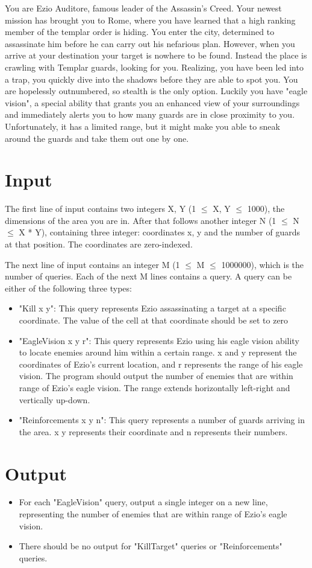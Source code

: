 

You are Ezio Auditore, famous leader of the Assassin's Creed. Your newest mission has brought you to Rome, where you have learned that a high ranking member of the templar order is hiding. You enter the city, determined to assassinate him before he can carry out his nefarious plan.
However, when you arrive at your destination your target is nowhere to be found. Instead the place is crawling with Templar guards, looking for you. Realizing, you have been led into a trap, you quickly dive into the shadows before they are able to spot you.
You are hopelessly outnumbered, so stealth is the only option. Luckily you have "eagle vision", a special ability that grants you an enhanced view of your surroundings and immediately alerts you to how many guards are in close proximity to you. Unfortunately, it has a limited range, but it might make you able to sneak around the guards and take them out one by one.

\section*{Input}

The first line of input contains two integers X, Y (1 $\le$ X, Y $\le$ 1000), the dimensions of the area you are in. After that follows another integer N (1 $\le$ N $\le$ X * Y), containing three integer: coordinates x, y and the number of guards at that position. The coordinates are zero-indexed.

The next line of input contains an integer M (1 $\le$ M $\le$ 1000000), which is the number of queries. Each of the next M lines contains a query. A query can be either of the following three types:

\begin{itemize}
    \item "Kill x y": This query represents Ezio assassinating a target at a specific coordinate. The value of the cell at that coordinate should be set to zero
    \item "EagleVision x y r": This query represents Ezio using his eagle vision ability to locate enemies around him within a certain range. x and y represent the coordinates of Ezio's current location, and r represents the range of his eagle vision. The program should output the number of enemies that are within range of Ezio's eagle vision. The range extends horizontally left-right and vertically up-down.
    \item "Reinforcements x y n": This query represents a number of guards arriving in the area. x y represents their coordinate and n represents their numbers.
\end{itemize}

\section*{Output}

\begin{itemize}
    \item For each "EagleVision" query, output a single integer on a new line, representing the number of enemies that are within range of Ezio's eagle vision.
    \item There should be no output for "KillTarget" queries or "Reinforcements" queries. 
\end{itemize}